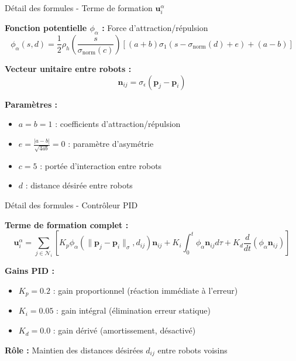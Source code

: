 \begin{frame}{Détail des formules - Terme de formation $\mathbf{u}_i^{\alpha}$}

\textbf{Fonction potentielle $\phi_{\alpha}$ :} Force d'attraction/répulsion
\begin{equation}
\phi_{\alpha}(s,d) = \frac{1}{2} \rho_h\left(\frac{s}{\sigma_{\text{norm}}(c)}\right) \left[(a+b) \sigma_1(s - \sigma_{\text{norm}}(d) + e) + (a-b)\right]
\end{equation}

\textbf{Vecteur unitaire entre robots :}
\begin{equation}
\mathbf{n}_{ij} = \sigma_\epsilon(\mathbf{p}_j - \mathbf{p}_i)
\end{equation}

\textbf{Paramètres :}
\begin{itemize}
\item $a = b = 1$ : coefficients d'attraction/répulsion
\item $e = \frac{|a-b|}{\sqrt{4ab}} = 0$ : paramètre d'asymétrie
\item $c = 5$ : portée d'interaction entre robots
\item $d$ : distance désirée entre robots
\end{itemize}

\end{frame}

\begin{frame}{Détail des formules - Contrôleur PID}

\textbf{Terme de formation complet :}
\begin{equation}
\mathbf{u}_i^{\alpha} = \sum_{j \in \mathcal{N}_i} \left[ K_p \phi_{\alpha}(\|\mathbf{p}_j - \mathbf{p}_i\|_\sigma, d_{ij}) \mathbf{n}_{ij} + K_i \int_0^t \phi_{\alpha} \mathbf{n}_{ij} d\tau + K_d \frac{d}{dt}(\phi_{\alpha} \mathbf{n}_{ij}) \right]
\end{equation}

\textbf{Gains PID :}
\begin{itemize}
\item $K_p = 0.2$ : gain proportionnel (réaction immédiate à l'erreur)
\item $K_i = 0.05$ : gain intégral (élimination erreur statique)
\item $K_d = 0.0$ : gain dérivé (amortissement, désactivé)
\end{itemize}

\textbf{Rôle :} Maintien des distances désirées $d_{ij}$ entre robots voisins

\end{frame}

